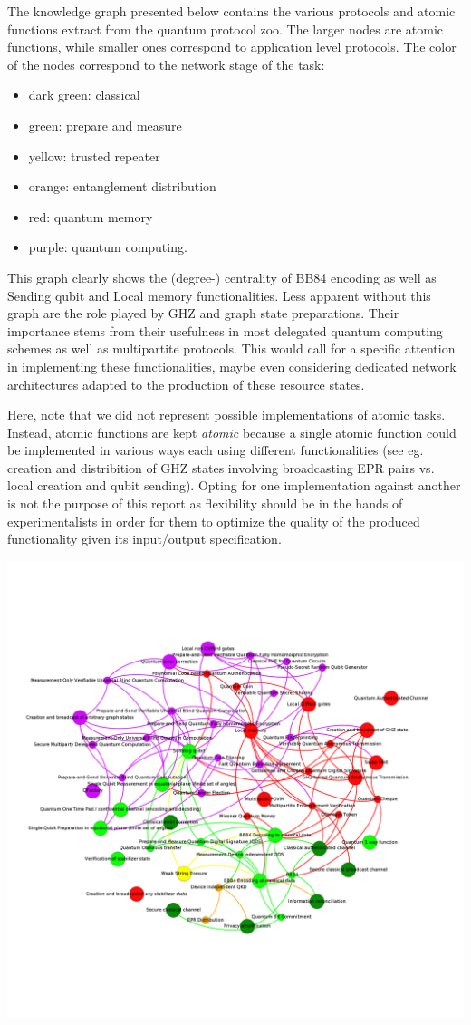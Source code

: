 \documentclass[11pt]{article}
\begin{document}
The knowledge graph presented below contains the various protocols and atomic functions extract from the quantum protocol zoo. The larger nodes are atomic functions, while smaller ones correspond to application level protocols. The color of the nodes correspond to the network stage of the task: 
\begin{itemize}
\item dark green: classical
\item green: prepare and measure
\item yellow: trusted repeater
\item orange: entanglement distribution
\item red: quantum memory
\item purple: quantum computing.
\end{itemize}

This graph clearly shows the (degree-) centrality of BB84 encoding as well as Sending qubit and Local memory functionalities. Less apparent without this graph are the role played by GHZ and graph state preparations. Their importance stems from their usefulness in most delegated quantum computing schemes as well as multipartite protocols. This would call for a specific attention in implementing these functionalities, maybe even considering  dedicated network architectures adapted to the production of these resource states.

Here, note that  we did not represent possible implementations of atomic tasks. Instead, atomic functions are kept \emph{atomic} because a single atomic function could be implemented in various ways each using different functionalities (see eg. creation and distribition of GHZ states involving broadcasting EPR pairs vs. local creation and qubit sending). Opting for one implementation against another is not the purpose of this report as flexibility should be in the hands of experimentalists in order for them to optimize the quality of the produced functionality given its input/output specification.

\begin{center}
\includegraphics[width=.9\linewidth]{./_rsc/atomic.kg.png}
\end{center}
\end{document}
